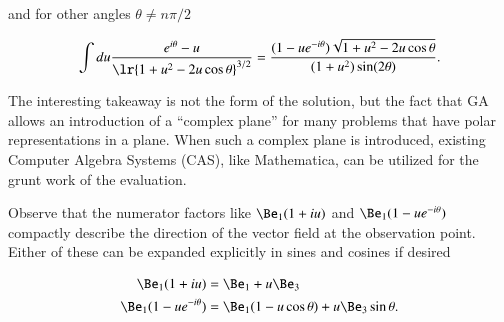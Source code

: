 and for other angles \( \theta \neq n \pi/2 \)

\begin{dmath}\label{eqn:linecharge:100}
\int
du \frac{ e^{i\theta} - u }{ \lr{ 1 + u^2 - 2 u \cos\theta }^{3/2} }
= \frac{(1 -u e^{-i\theta}) \sqrt{1 + u^2 - 2 u \cos\theta}}{(1 + u^2) \sin(2\theta)}.
\end{dmath}

The interesting takeaway is not the form of the solution, but the fact that GA allows an introduction of a ``complex plane'' for many problems that have polar representations in a plane.
When such a complex plane is introduced,
existing Computer Algebra Systems (CAS), like Mathematica, can be utilized for the grunt work of the evaluation.

Observe that the numerator factors like \( \Be_1 (1 + i u) \) and \( \Be_1(1 - u e^{-i\theta}) \)
compactly describe the direction of the vector field at the observation point.
Either of these can be expanded explicitly in sines and cosines if desired

\begin{dmath}\label{eqn:linecharge:140}
\begin{aligned}
\Be_1 (1 + i u) &= \Be_1 + u \Be_3 \\
\Be_1(1 - u e^{-i\theta}) &= \Be_1(1 - u \cos\theta) + u \Be_3 \sin\theta.
\end{aligned}
\end{dmath}

